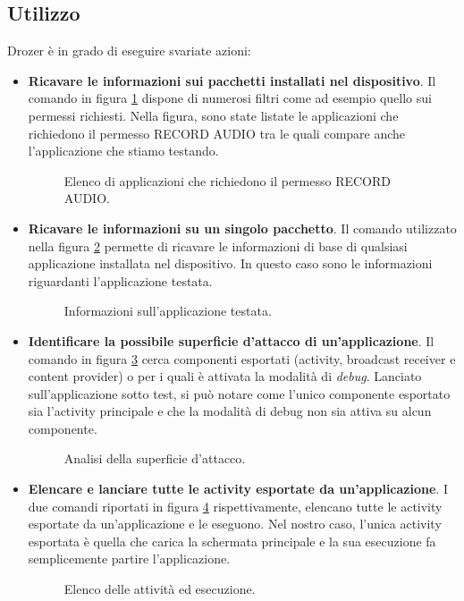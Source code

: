 \subsection{Utilizzo}
Drozer è in grado di eseguire svariate azioni:
\begin{itemize}
	\item \textbf{Ricavare le informazioni sui pacchetti installati nel dispositivo}. Il comando in figura \ref{fig:drozerList} dispone di numerosi filtri come ad esempio quello sui permessi richiesti. Nella figura, sono state listate le applicazioni che richiedono il permesso RECORD AUDIO tra le quali compare anche l'applicazione che stiamo testando.
	\begin{figure}[h]
		\centering 
		\caption{Elenco di applicazioni che richiedono il permesso RECORD AUDIO.}
		\label{fig:drozerList}
	\end{figure}

	\item \textbf{Ricavare le informazioni su un singolo pacchetto}. Il comando utilizzato nella figura \ref{fig:appInfo} permette di ricavare le informazioni di base di qualsiasi applicazione installata nel dispositivo. In questo caso sono le informazioni riguardanti l'applicazione testata.
	\begin{figure}[h]
		\centering 
		\caption{Informazioni sull'applicazione testata.}
		\label{fig:appInfo}
	\end{figure}

	\item \textbf{Identificare la possibile superficie d'attacco di un'applicazione}. Il comando in figura \ref{fig:attackSurface} cerca componenti esportati (activity, broadcast receiver e content provider) o per i quali è attivata la modalità di \emph{debug}. Lanciato sull'applicazione sotto test, si può notare come l'unico componente esportato sia l'activity principale e che la modalità di debug non sia attiva su alcun componente.
	\begin{figure}[h]
		\centering 
		\caption{Analisi della superficie d'attacco.}
		\label{fig:attackSurface}
	\end{figure}

	\item \textbf{Elencare e lanciare tutte le activity esportate da un'applicazione}. I due comandi riportati in figura \ref{fig:activities} rispettivamente, elencano tutte le activity esportate da un'applicazione e le eseguono. Nel nostro caso, l'unica activity esportata è quella che carica la schermata principale e la sua esecuzione fa semplicemente partire l'applicazione. 
	\begin{figure}[h]
		\centering 
		\caption{Elenco delle attività ed esecuzione.}
		\label{fig:activities}
	\end{figure}


\end{itemize}
